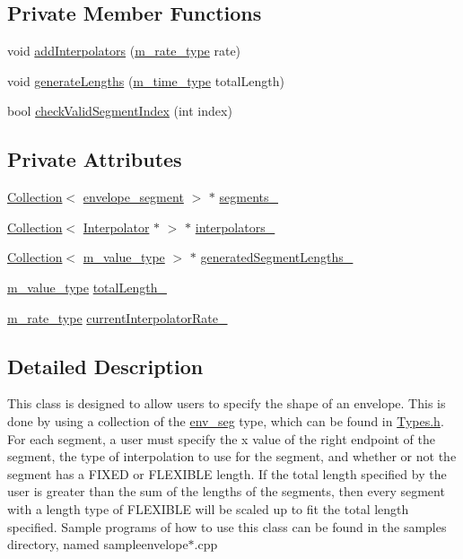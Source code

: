 \subsection*{Private Member Functions}
\begin{CompactItemize}
\item 
void \hyperlink{classEnvelope_d0}{add\-Interpolators} (\hyperlink{Types_8h_a4}{m\_\-rate\_\-type} rate)
\item 
void \hyperlink{classEnvelope_d1}{generate\-Lengths} (\hyperlink{Types_8h_a2}{m\_\-time\_\-type} total\-Length)
\item 
bool \hyperlink{classEnvelope_d2}{check\-Valid\-Segment\-Index} (int index)
\end{CompactItemize}
\subsection*{Private Attributes}
\begin{CompactItemize}
\item 
\hyperlink{classCollection}{Collection}$<$ \hyperlink{structenvelope__segment}{envelope\_\-segment} $>$ $\ast$ \hyperlink{classEnvelope_r0}{segments\_\-}
\item 
\hyperlink{classCollection}{Collection}$<$ \hyperlink{classInterpolator}{Interpolator} $\ast$ $>$ $\ast$ \hyperlink{classEnvelope_r1}{interpolators\_\-}
\item 
\hyperlink{classCollection}{Collection}$<$ \hyperlink{Types_8h_a3}{m\_\-value\_\-type} $>$ $\ast$ \hyperlink{classEnvelope_r2}{generated\-Segment\-Lengths\_\-}
\item 
\hyperlink{Types_8h_a3}{m\_\-value\_\-type} \hyperlink{classEnvelope_r3}{total\-Length\_\-}
\item 
\hyperlink{Types_8h_a4}{m\_\-rate\_\-type} \hyperlink{classEnvelope_r4}{current\-Interpolator\-Rate\_\-}
\end{CompactItemize}


\subsection{Detailed Description}
This class is designed to allow users to specify the shape of an envelope. This is done by using a collection of the \hyperlink{structenv__seg}{env\_\-seg} type, which can be found in \hyperlink{Types_8h}{Types.h}. For each segment, a user must specify the x value of the right endpoint of the segment, the type of interpolation to use for the segment, and whether or not the segment has a FIXED or FLEXIBLE length. If the total length specified by the user is greater than the sum of the lengths of the segments, then every segment with a length type of FLEXIBLE will be scaled up to fit the total length specified. Sample programs of how to use this class can be found in the samples directory, named sampleenvelope$\ast$.cpp

